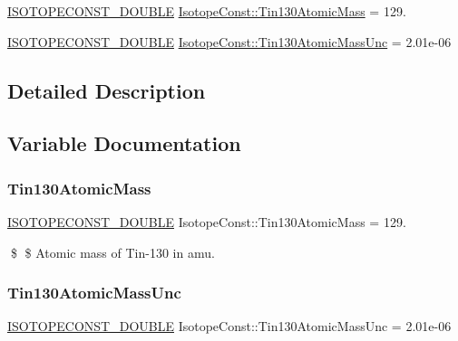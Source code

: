 \begin{DoxyCompactItemize}
\item 
\mbox{\hyperlink{group___isotope_const-_macros_ga8f45a7272ce02c0b4c65c44636ed719a}{I\+S\+O\+T\+O\+P\+E\+C\+O\+N\+S\+T\+\_\+\+D\+O\+U\+B\+LE}} \mbox{\hyperlink{group___isotope_const-_tin-_sn130_ga59e92ee17288deab8a24f6955fa2816d}{Isotope\+Const\+::\+Tin130\+Atomic\+Mass}} = 129.
\item 
\mbox{\hyperlink{group___isotope_const-_macros_ga8f45a7272ce02c0b4c65c44636ed719a}{I\+S\+O\+T\+O\+P\+E\+C\+O\+N\+S\+T\+\_\+\+D\+O\+U\+B\+LE}} \mbox{\hyperlink{group___isotope_const-_tin-_sn130_ga73f795468e3948f1c58b107dd4dabdf1}{Isotope\+Const\+::\+Tin130\+Atomic\+Mass\+Unc}} = 2.\+01e-\/06
\end{DoxyCompactItemize}


\subsection{Detailed Description}


\subsection{Variable Documentation}
\mbox{\label{group___isotope_const-_tin-_sn130_ga59e92ee17288deab8a24f6955fa2816d}} 
\subsubsection{\texorpdfstring{Tin130\+Atomic\+Mass}{Tin130AtomicMass}}
{\footnotesize\ttfamily \mbox{\hyperlink{group___isotope_const-_macros_ga8f45a7272ce02c0b4c65c44636ed719a}{I\+S\+O\+T\+O\+P\+E\+C\+O\+N\+S\+T\+\_\+\+D\+O\+U\+B\+LE}} Isotope\+Const\+::\+Tin130\+Atomic\+Mass = 129.}

\$ \$ Atomic mass of Tin-\/130 in amu. \mbox{\label{group___isotope_const-_tin-_sn130_ga73f795468e3948f1c58b107dd4dabdf1}} 
\subsubsection{\texorpdfstring{Tin130\+Atomic\+Mass\+Unc}{Tin130AtomicMassUnc}}
{\footnotesize\ttfamily \mbox{\hyperlink{group___isotope_const-_macros_ga8f45a7272ce02c0b4c65c44636ed719a}{I\+S\+O\+T\+O\+P\+E\+C\+O\+N\+S\+T\+\_\+\+D\+O\+U\+B\+LE}} Isotope\+Const\+::\+Tin130\+Atomic\+Mass\+Unc = 2.\+01e-\/06}

